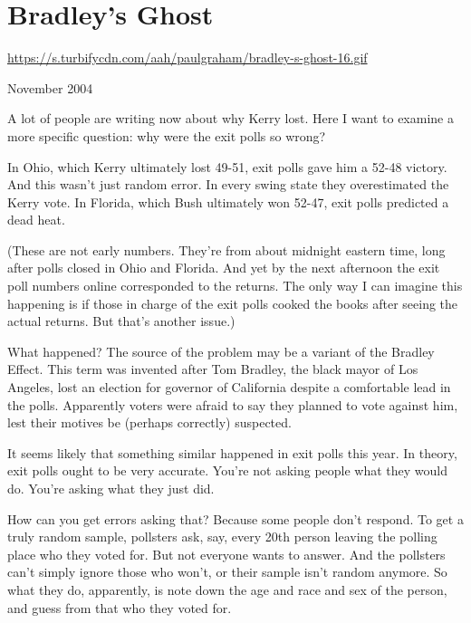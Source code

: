 \chapter{Bradley's Ghost}


            
              
                \href{https://s.turbifycdn.com/aah/paulgraham/bradley-s-ghost-16.gif}{https://s.turbifycdn.com/aah/paulgraham/bradley-s-ghost-16.gif}



November 2004


                  A lot of people are writing now about why Kerry lost. Here I
                  want to examine a more specific question: why were the exit
                  polls so wrong?

In Ohio, which Kerry ultimately
                  lost 49-51, exit polls gave him a 52-48 victory. And this
                  wasn't just random error. In every swing state they
                  overestimated the Kerry vote. In Florida, which Bush
                  ultimately won 52-47, exit polls predicted a dead heat.

(These
                  are not early numbers. They're from about midnight eastern
                  time, long after polls closed in Ohio and Florida. And yet by
                  the next afternoon the exit poll numbers online corresponded
                  to the returns. The only way I can imagine this happening is
                  if those in charge of the exit polls cooked the books after
                  seeing the actual returns. But that's another issue.)

What
                  happened? The source of the problem may be a variant of the
                  Bradley Effect. This term was invented after Tom Bradley, the
                  black mayor of Los Angeles, lost an election for governor of
                  California despite a comfortable lead in the polls. Apparently
                  voters were afraid to say they planned to vote against him,
                  lest their motives be (perhaps correctly) suspected.

It
                  seems likely that something similar happened in exit polls
                  this year. In theory, exit polls ought to be very accurate.
                  You're not asking people what they would do. You're asking
                  what they just did.

How can you get errors asking
                  that? Because some people don't respond. To get a truly random
                  sample, pollsters ask, say, every 20th person leaving the
                  polling place who they voted for. But not everyone wants to
                  answer. And the pollsters can't simply ignore those who won't,
                  or their sample isn't random anymore. So what they do,
                  apparently, is note down the age and race and sex of the
                  person, and guess from that who they voted for.

